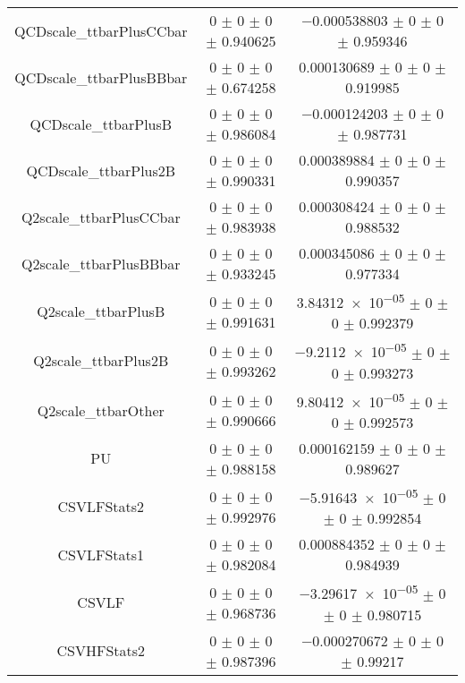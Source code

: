 \begin{table}
\begin{tabular}{ccc}
QCDscale\_ttbarPlusCCbar & \num{0} $\pm$ \num{0} $\pm$ \num{0} $\pm$ \num{0.940625} & \num{-0.000538803} $\pm$ \num{0} $\pm$ \num{0} $\pm$ \num{0.959346}\\
QCDscale\_ttbarPlusBBbar & \num{0} $\pm$ \num{0} $\pm$ \num{0} $\pm$ \num{0.674258} & \num{0.000130689} $\pm$ \num{0} $\pm$ \num{0} $\pm$ \num{0.919985}\\
QCDscale\_ttbarPlusB & \num{0} $\pm$ \num{0} $\pm$ \num{0} $\pm$ \num{0.986084} & \num{-0.000124203} $\pm$ \num{0} $\pm$ \num{0} $\pm$ \num{0.987731}\\
QCDscale\_ttbarPlus2B & \num{0} $\pm$ \num{0} $\pm$ \num{0} $\pm$ \num{0.990331} & \num{0.000389884} $\pm$ \num{0} $\pm$ \num{0} $\pm$ \num{0.990357}\\
Q2scale\_ttbarPlusCCbar & \num{0} $\pm$ \num{0} $\pm$ \num{0} $\pm$ \num{0.983938} & \num{0.000308424} $\pm$ \num{0} $\pm$ \num{0} $\pm$ \num{0.988532}\\
Q2scale\_ttbarPlusBBbar & \num{0} $\pm$ \num{0} $\pm$ \num{0} $\pm$ \num{0.933245} & \num{0.000345086} $\pm$ \num{0} $\pm$ \num{0} $\pm$ \num{0.977334}\\
Q2scale\_ttbarPlusB & \num{0} $\pm$ \num{0} $\pm$ \num{0} $\pm$ \num{0.991631} & \num{3.84312e-05} $\pm$ \num{0} $\pm$ \num{0} $\pm$ \num{0.992379}\\
Q2scale\_ttbarPlus2B & \num{0} $\pm$ \num{0} $\pm$ \num{0} $\pm$ \num{0.993262} & \num{-9.2112e-05} $\pm$ \num{0} $\pm$ \num{0} $\pm$ \num{0.993273}\\
Q2scale\_ttbarOther & \num{0} $\pm$ \num{0} $\pm$ \num{0} $\pm$ \num{0.990666} & \num{9.80412e-05} $\pm$ \num{0} $\pm$ \num{0} $\pm$ \num{0.992573}\\
PU & \num{0} $\pm$ \num{0} $\pm$ \num{0} $\pm$ \num{0.988158} & \num{0.000162159} $\pm$ \num{0} $\pm$ \num{0} $\pm$ \num{0.989627}\\
CSVLFStats2 & \num{0} $\pm$ \num{0} $\pm$ \num{0} $\pm$ \num{0.992976} & \num{-5.91643e-05} $\pm$ \num{0} $\pm$ \num{0} $\pm$ \num{0.992854}\\
CSVLFStats1 & \num{0} $\pm$ \num{0} $\pm$ \num{0} $\pm$ \num{0.982084} & \num{0.000884352} $\pm$ \num{0} $\pm$ \num{0} $\pm$ \num{0.984939}\\
CSVLF & \num{0} $\pm$ \num{0} $\pm$ \num{0} $\pm$ \num{0.968736} & \num{-3.29617e-05} $\pm$ \num{0} $\pm$ \num{0} $\pm$ \num{0.980715}\\
CSVHFStats2 & \num{0} $\pm$ \num{0} $\pm$ \num{0} $\pm$ \num{0.987396} & \num{-0.000270672} $\pm$ \num{0} $\pm$ \num{0} $\pm$ \num{0.99217}\\

\end{tabular}
\end{table}
